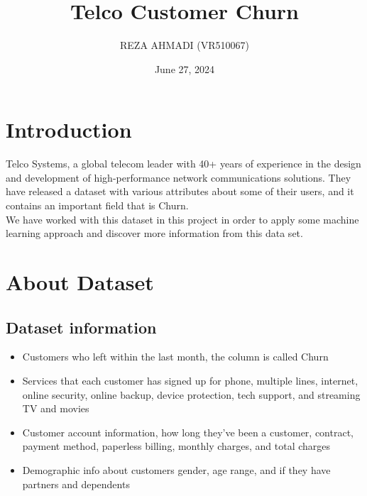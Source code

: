 \documentclass{article}
\begin{document}
\setcounter{section}{0}

\title{Telco Customer Churn}
\author{REZA AHMADI (VR510067)}
\date{June 27, 2024}

\maketitle

\newpage

\tableofcontents

\newpage

\section{Introduction}
Telco Systems, a global telecom leader with 40+ years of experience in the design and development of high-performance network communications solutions.
They have released a dataset with various attributes about some of their users, and it contains an important field that is Churn.\\
We have worked with this dataset in this project in order to apply some machine learning approach and discover more information from this data set.

\section{About Dataset}
\subsection{Dataset information}
\begin{itemize}
  \item Customers who left within the last month, the column is called Churn
  \item Services that each customer has signed up for phone, multiple lines, internet, online security, online backup, device protection, tech support, and streaming TV and movies
  \item Customer account information, how long they've been a customer, contract, payment method, paperless billing, monthly charges, and total charges
  \item Demographic info about customers gender, age range, and if they have partners and dependents
\end{itemize}
\end{document}
